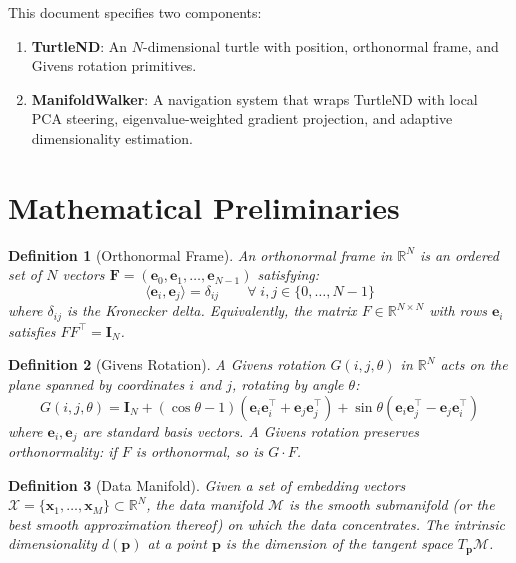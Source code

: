 \documentclass[11pt,letterpaper]{article}
\newtheorem{definition}{Definition}[section]
\newcommand{\R}{\mathbb{R}}
\newcommand{\fr}{\mathbf{F}}
\newcommand{\pos}{\mathbf{p}}
\newcommand{\basis}{\mathbf{e}}
\newcommand{\manifold}{\mathcal{M}}
\newcommand{\tangent}{T}
\newcommand{\eye}{\mathbf{I}}
\begin{document}
This document specifies two components:
\begin{enumerate}[label=(\roman*)]
  \item \textbf{TurtleND}: An $N$-dimensional turtle with position, orthonormal frame, and Givens rotation primitives.
  \item \textbf{ManifoldWalker}: A navigation system that wraps TurtleND with local PCA steering, eigenvalue-weighted gradient projection, and adaptive dimensionality estimation.
\end{enumerate}

\section{Mathematical Preliminaries}
\label{sec:prelim}

\begin{definition}[Orthonormal Frame]
\label{def:frame}
An \emph{orthonormal frame} in $\R^N$ is an ordered set of $N$ vectors
$\fr = (\basis_0, \basis_1, \ldots, \basis_{N-1})$ satisfying:
\begin{equation}
  \langle \basis_i, \basis_j \rangle = \delta_{ij}
  \qquad \forall\; i, j \in \{0, \ldots, N-1\}
\end{equation}
where $\delta_{ij}$ is the Kronecker delta. Equivalently, the matrix
$F \in \R^{N \times N}$ with rows $\basis_i$ satisfies $F F^\top = \eye_N$.
\end{definition}

\begin{definition}[Givens Rotation]
\label{def:givens}
A \emph{Givens rotation} $G(i, j, \theta)$ in $\R^N$ acts on the plane
spanned by coordinates $i$ and $j$, rotating by angle $\theta$:
\begin{equation}
  G(i, j, \theta) = \eye_N + (\cos\theta - 1)(\mathbf{e}_i\mathbf{e}_i^\top + \mathbf{e}_j\mathbf{e}_j^\top) + \sin\theta(\mathbf{e}_i\mathbf{e}_j^\top - \mathbf{e}_j\mathbf{e}_i^\top)
\end{equation}
where $\mathbf{e}_i, \mathbf{e}_j$ are standard basis vectors. A Givens
rotation preserves orthonormality: if $F$ is orthonormal, so is $G \cdot F$.
\end{definition}

\begin{definition}[Data Manifold]
\label{def:manifold}
Given a set of embedding vectors $\mathcal{X} = \{\mathbf{x}_1, \ldots, \mathbf{x}_M\} \subset \R^N$,
the \emph{data manifold} $\manifold$ is the smooth submanifold (or the
best smooth approximation thereof) on which the data concentrates. The
\emph{intrinsic dimensionality} $d(\pos)$ at a point $\pos$ is the
dimension of the tangent space $\tangent_\pos\manifold$.
\end{definition}
\end{document}
